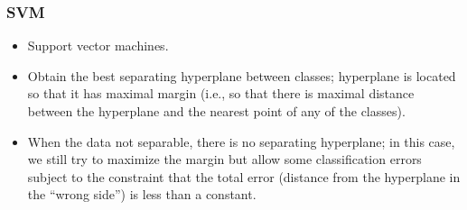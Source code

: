 \begin{frame}
\frametitle{SVM}
\begin{itemize}
\item Support vector machines.

\item Obtain the best separating hyperplane between classes; hyperplane is located
so that it has maximal margin (i.e., so that there is maximal distance between the
hyperplane and the nearest point of any of the classes). 

\item When the data not separable,
there is no separating hyperplane; in this case, we still try to maximize the margin
but allow some classification errors subject to the constraint that
the total error (distance from the hyperplane in the ``wrong side'') is
less than a constant.
\end{itemize}
\end{frame}








